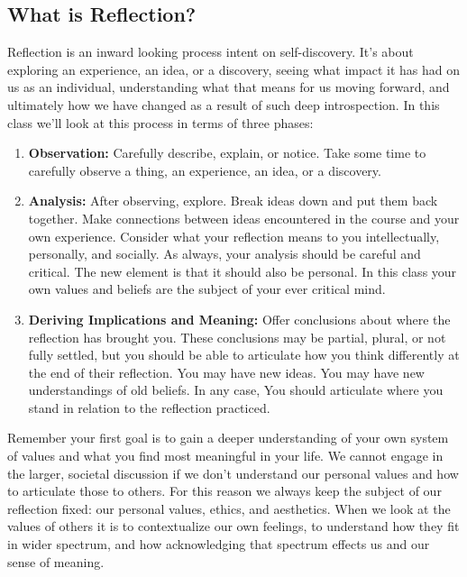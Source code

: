 \documentclass[nobib]{tufte-handout}
\begin{document}
\subsection*{What is Reflection?}

Reflection is an inward looking process intent on self-discovery. It's about exploring an experience, an idea, or a discovery, seeing what impact it has had on us as an individual, understanding what that means for us moving forward, and ultimately how we have changed as a result of such deep introspection. In this class we'll look at this process in terms of three phases:
\begin{enumerate}
\item \textbf{Observation:} Carefully describe, explain, or notice. Take some time to carefully observe a thing, an experience,  an idea, or a discovery. \newline

\item \textbf{Analysis:} After observing, explore. Break ideas down and put them back together. Make connections between ideas encountered in the course and your own experience. Consider what your reflection means to you intellectually, personally, and socially.  As always, your analysis should be careful and critical. The new element is that it should also be personal.  In this class your own values and beliefs are the subject of your ever critical mind. \newline

\item \textbf{Deriving Implications and Meaning:} Offer conclusions about where the reflection has brought you. These conclusions may be partial, plural, or not fully settled, but you should be able to articulate how you think differently at the end of their reflection. You may have new ideas. You may have new understandings of old beliefs. In any case, You should articulate where you stand in relation to the reflection practiced.
\end{enumerate}

Remember your first goal is to gain a deeper understanding of your own system of values and what you find most meaningful in your life. We cannot engage in the larger, societal discussion if we don't understand our personal values and how to articulate those to others. For this reason we always keep the subject of our reflection fixed: our personal values, ethics, and aesthetics. When we look at the values of others it is to contextualize our own feelings, to understand how they fit in wider spectrum, and how acknowledging that spectrum effects us and our sense of meaning.
\end{document}
